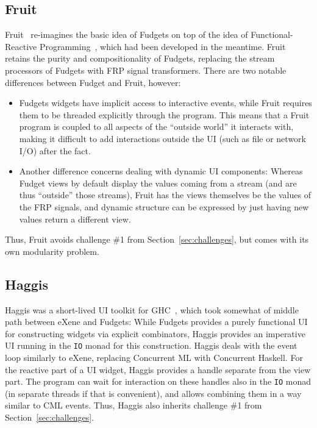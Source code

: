 \documentclass[sigplan,screen]{acmart}
\begin{document}
\subsection{Fruit}

Fruit~\cite{Fruit} re-imagines the basic idea of Fudgets on top of the
idea of Functional-Reactive Programming~\cite{FRP}, which had been
developed in the meantime.  Fruit retains the purity and
compositionality of Fudgets,  replacing the stream processors of
Fudgets with FRP signal transformers.  There are two notable
differences between Fudget and Fruit, however:
\begin{itemize}
\item Fudgets widgets have implicit access to interactive events,
  while Fruit requires them to be threaded explicitly through the
  program.  This means that a Fruit program is coupled to all aspects
  of the ``outside world'' it interacts with, making it difficult to
  add interactions outside the UI (such as file or network I/O) after
  the fact.
\item Another difference concerns dealing with dynamic UI components:
  Whereas Fudget views by default display the values coming from a
  stream (and are thus ``outside'' those streams), Fruit has the views
  themselves be the values of the FRP signals, and dynamic structure
  can be expressed by just having new values return a different view.
\end{itemize}
%
Thus, Fruit avoids challenge \#1 from Section~\ref{sec:challenges},
but comes with its own modularity problem.

\subsection{Haggis}

Haggis was a short-lived UI toolkit for GHC~\cite{Haggis}, which took
somewhat of middle path between eXene and Fudgets: While Fudgets
provides a purely functional UI for constructing widgets via explicit
combinators, Haggis provides an imperative UI running in the
\texttt{IO} monad for this construction.  Haggis deals with the event
loop similarly to eXene, replacing Concurrent ML with Concurrent
Haskell.  For the reactive part of a UI widget, Haggis provides a
handle separate from the view part.  The program can wait for
interaction on these handles also in the \texttt{IO} monad (in
separate threads if that is convenient), and allows combining them in
a way similar to CML events.  Thus, Haggis also inherits challenge
\#1 from Section~\ref{sec:challenges}.
\end{document}

